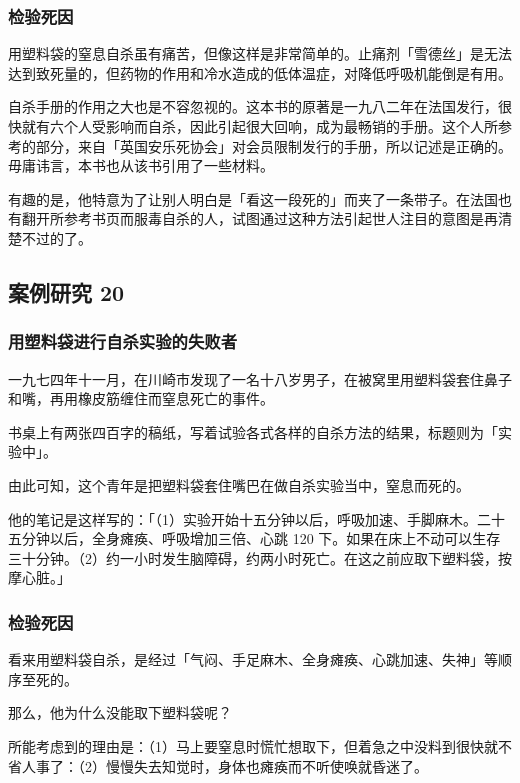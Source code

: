 \documentclass[UTF8]{ctexart}
\begin{document}
\subsubsection*{检验死因}

用塑料袋的窒息自杀虽有痛苦，但像这样是非常简单的。止痛剂「雪德丝」是无法达到致死量的，但药物的作用和冷水造成的低体温症，对降低呼吸机能倒是有用。

自杀手册的作用之大也是不容忽视的。这本书的原著是一九八二年在法国发行，很快就有六个人受影响而自杀，因此引起很大回响，成为最畅销的手册。这个人所参考的部分，来自「英国安乐死协会」对会员限制发行的手册，所以记述是正确的。毋庸讳言，本书也从该书引用了一些材料。

有趣的是，他特意为了让别人明白是「看这一段死的」而夹了一条带子。在法国也有翻开所参考书页而服毒自杀的人，试图通过这种方法引起世人注目的意图是再清楚不过的了。

\subsection{案例研究 20}

\subsubsection*{用塑料袋进行自杀实验的失败者}

一九七四年十一月，在川崎市发现了一名十八岁男子，在被窝里用塑料袋套住鼻子和嘴，再用橡皮筋缠住而窒息死亡的事件。

书桌上有两张四百字的稿纸，写着试验各式各样的自杀方法的结果，标题则为「实验中」。

由此可知，这个青年是把塑料袋套住嘴巴在做自杀实验当中，窒息而死的。

他的笔记是这样写的：「（1）实验开始十五分钟以后，呼吸加速、手脚麻木。二十五分钟以后，全身瘫痪、呼吸增加三倍、心跳 120 下。如果在床上不动可以生存三十分钟。（2）约一小时发生脑障碍，约两小时死亡。在这之前应取下塑料袋，按摩心脏。」

\subsubsection*{检验死因}

看来用塑料袋自杀，是经过「气闷、手足麻木、全身瘫痪、心跳加速、失神」等顺序至死的。

那么，他为什么没能取下塑料袋呢？

所能考虑到的理由是：（1）马上要窒息时慌忙想取下，但着急之中没料到很快就不省人事了：（2）慢慢失去知觉时，身体也瘫痪而不听使唤就昏迷了。
\end{document}
